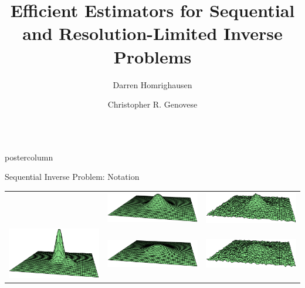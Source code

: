 \documentclass[final]{beamer}
\title{\huge Efficient Estimators for Sequential and
Resolution-Limited Inverse Problems
}
\author[Homrighausen,Genovese]{Darren Homrighausen \and Christopher R. Genovese}
\institute[CMU Statistics]{Department of Statistics, Carnegie Mellon University}
\date[]{}
\newlength{\columnheight}
\begin{document}
\begin{frame}
  \begin{columns}

    \begin{column}{.32\textwidth}
      \begin{beamercolorbox}[center,wd=\textwidth]{postercolumn}
        \begin{minipage}[T]{.95\textwidth} 
          \parbox[t][\columnheight]{\textwidth}{
            \vfill
            \begin{block}{Sequential Inverse Problem: Notation}
              \begin{table}
\centering
\begin{tabular}{ccc}
& \includegraphics[width=2.6in,trim=100 225 0 235,clip]{./figures/inverseProblemEx2a.eps} 
& \includegraphics[width=2.6in,trim=100 225 0 235,clip]{./figures/inverseProblemEx3a.eps} \\
  \includegraphics[width=2.6in,trim=100 225 0 235,clip]{./figures/inverseProblemEx1.eps}
& \includegraphics[width=2.6in,trim=100 225 0 235,clip]{./figures/inverseProblemEx2b.eps} 
& \includegraphics[width=2.6in,trim=100 225 0 235,clip]{./figures/inverseProblemEx3b.eps} \\

\end{tabular}
\end{table}
\end{block}}
\end{minipage}
\end{beamercolorbox}
\end{column}
\end{columns}
\end{frame}
\end{document}

